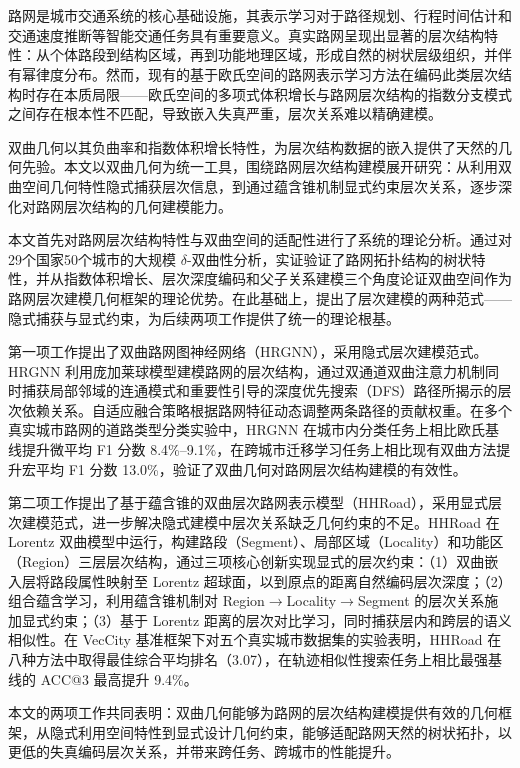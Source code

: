 \chapter*{\xiaosan{}}

路网是城市交通系统的核心基础设施，其表示学习对于路径规划、行程时间估计和交通速度推断等智能交通任务具有重要意义。真实路网呈现出显著的层次结构特性：从个体路段到结构区域，再到功能地理区域，形成自然的树状层级组织，并伴有幂律度分布。然而，现有的基于欧氏空间的路网表示学习方法在编码此类层次结构时存在本质局限——欧氏空间的多项式体积增长与路网层次结构的指数分支模式之间存在根本性不匹配，导致嵌入失真严重，层次关系难以精确建模。

双曲几何以其负曲率和指数体积增长特性，为层次结构数据的嵌入提供了天然的几何先验。本文以双曲几何为统一工具，围绕路网层次结构建模展开研究：从利用双曲空间几何特性隐式捕获层次信息，到通过蕴含锥机制显式约束层次关系，逐步深化对路网层次结构的几何建模能力。

本文首先对路网层次结构特性与双曲空间的适配性进行了系统的理论分析。通过对29个国家50个城市的大规模 $\delta$-双曲性分析，实证验证了路网拓扑结构的树状特性，并从指数体积增长、层次深度编码和父子关系建模三个角度论证双曲空间作为路网层次建模几何框架的理论优势。在此基础上，提出了层次建模的两种范式——隐式捕获与显式约束，为后续两项工作提供了统一的理论根基。

第一项工作提出了双曲路网图神经网络（HRGNN），采用隐式层次建模范式。HRGNN 利用庞加莱球模型建模路网的层次结构，通过双通道双曲注意力机制同时捕获局部邻域的连通模式和重要性引导的深度优先搜索（DFS）路径所揭示的层次依赖关系。自适应融合策略根据路网特征动态调整两条路径的贡献权重。在多个真实城市路网的道路类型分类实验中，HRGNN 在城市内分类任务上相比欧氏基线提升微平均 F1 分数 8.4\%--9.1\%，在跨城市迁移学习任务上相比现有双曲方法提升宏平均 F1 分数 13.0\%，验证了双曲几何对路网层次结构建模的有效性。

第二项工作提出了基于蕴含锥的双曲层次路网表示模型（HHRoad），采用显式层次建模范式，进一步解决隐式建模中层次关系缺乏几何约束的不足。HHRoad 在 Lorentz 双曲模型中运行，构建路段（Segment）、局部区域（Locality）和功能区（Region）三层层次结构，通过三项核心创新实现显式的层次约束：（1）双曲嵌入层将路段属性映射至 Lorentz 超球面，以到原点的距离自然编码层次深度；（2）组合蕴含学习，利用蕴含锥机制对 Region$\to$Locality$\to$Segment 的层次关系施加显式约束；（3）基于 Lorentz 距离的层次对比学习，同时捕获层内和跨层的语义相似性。在 VecCity 基准框架下对五个真实城市数据集的实验表明，HHRoad 在八种方法中取得最佳综合平均排名（3.07），在轨迹相似性搜索任务上相比最强基线的 ACC@3 最高提升 9.4\%。

本文的两项工作共同表明：双曲几何能够为路网的层次结构建模提供有效的几何框架，从隐式利用空间特性到显式设计几何约束，能够适配路网天然的树状拓扑，以更低的失真编码层次关系，并带来跨任务、跨城市的性能提升。

\vspace{0.5cm}
